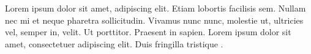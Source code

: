 \documentclass{article}
\begin{document}
    \beginnumbering
    \pstart
    Lorem ipsum dolor sit amet,
     adipiscing elit. Etiam
    lobortis facilisis sem. Nullam nec mi et neque pharetra
    sollicitudin. Vivamus nunc nunc, molestie ut, ultricies vel,
    semper in, velit.
    \pend
    \pstart
    Ut porttitor. Praesent in sapien. Lorem ipsum dolor sit amet,
    consectetuer adipiscing elit. Duis fringilla tristique
    .
    \pend
    \endnumbering
\end{document}
